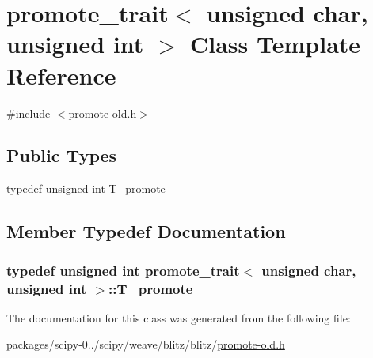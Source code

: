 \hypertarget{classpromote__trait_3_01unsigned_01char_00_01unsigned_01int_01_4}{}\section{promote\+\_\+trait$<$ unsigned char, unsigned int $>$ Class Template Reference}
\label{classpromote__trait_3_01unsigned_01char_00_01unsigned_01int_01_4}


{\ttfamily \#include $<$promote-\/old.\+h$>$}

\subsection*{Public Types}
\begin{DoxyCompactItemize}
\item 
typedef unsigned int \hyperlink{classpromote__trait_3_01unsigned_01char_00_01unsigned_01int_01_4_af270c0315d3d3bb043807abb293ba883}{T\+\_\+promote}
\end{DoxyCompactItemize}


\subsection{Member Typedef Documentation}
\hypertarget{classpromote__trait_3_01unsigned_01char_00_01unsigned_01int_01_4_af270c0315d3d3bb043807abb293ba883}{}
\subsubsection[{T\+\_\+promote}]{\setlength{\rightskip}{0pt plus 5cm}typedef unsigned int {\bf promote\+\_\+trait}$<$ unsigned char, unsigned int $>$\+::{\bf T\+\_\+promote}}\label{classpromote__trait_3_01unsigned_01char_00_01unsigned_01int_01_4_af270c0315d3d3bb043807abb293ba883}


The documentation for this class was generated from the following file\+:\begin{DoxyCompactItemize}
\item 
packages/scipy-\/0../scipy/weave/blitz/blitz/\hyperlink{promote-old_8h}{promote-\/old.\+h}\end{DoxyCompactItemize}
